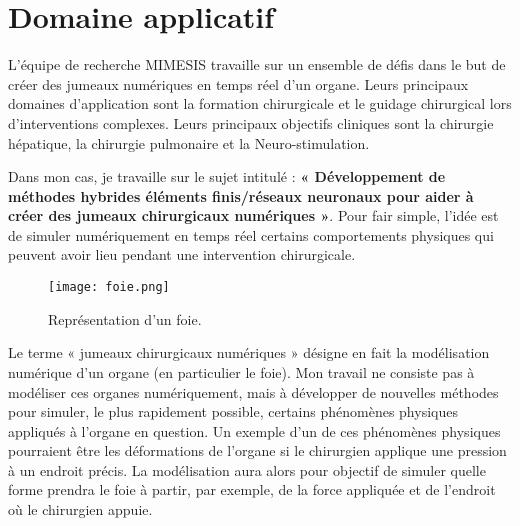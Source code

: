 \section{Domaine applicatif} \label{intro_appli}

L'équipe de recherche MIMESIS travaille sur un ensemble de défis dans le but de créer des jumeaux numériques en temps réel d'un organe. Leurs principaux domaines d'application sont la formation chirurgicale et le guidage chirurgical lors d'interventions complexes. Leurs principaux objectifs cliniques sont la chirurgie hépatique, la chirurgie pulmonaire et la Neuro-stimulation. 

Dans mon cas, je travaille sur le sujet intitulé : \textbf{« Développement de méthodes hybrides éléments finis/réseaux neuronaux pour aider à créer des jumeaux chirurgicaux numériques »}. Pour fair simple, l'idée est de simuler numériquement en temps réel certains comportements physiques qui peuvent avoir lieu pendant une intervention chirurgicale. 

\begin{minipage}{0.38\linewidth}
	\begin{figure}[H]
		\centering
		\texttt{[image: foie.png]}
		\caption{Représentation d'un foie.}
	\end{figure}
\end{minipage}
\begin{minipage}{0.58\linewidth}
	Le terme « jumeaux chirurgicaux numériques » désigne en fait la modélisation numérique d’un organe (en particulier le foie). Mon travail ne consiste pas à modéliser ces organes numériquement, mais à développer de nouvelles méthodes pour simuler, le plus rapidement possible, certains phénomènes physiques appliqués à l’organe en question. Un exemple d'un de ces phénomènes physiques pourraient être les déformations de l’organe si le chirurgien applique une pression à un endroit précis. La modélisation aura alors pour objectif de simuler quelle forme prendra le foie à partir, par exemple, de la force appliquée et de l’endroit où le chirurgien appuie. 	
\end{minipage}

